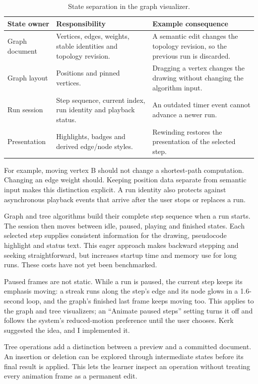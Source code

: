 \documentclass[11pt,a4paper]{article}
\begin{document}
\begin{table}[tbp]\small\centering
\caption{State separation in the graph visualizer.}\label{tab:state}
\begin{tabularx}{\linewidth}{@{}p{31mm}X X@{}}\toprule
State owner & Responsibility & Example consequence\\\midrule
Graph document & Vertices, edges, weights, stable identities and topology revision. & A semantic edit changes the topology revision, so the previous run is discarded.\\
Graph layout & Positions and pinned vertices. & Dragging a vertex changes the drawing without changing the algorithm input.\\
Run session & Step sequence, current index, run identity and playback status. & An outdated timer event cannot advance a newer run.\\
Presentation & Highlights, badges and derived edge/node styles. & Rewinding restores the presentation of the selected step.\\\bottomrule
\end{tabularx}
\end{table}

For example, moving vertex B should not change a shortest-path computation. Changing an edge weight should. Keeping position data separate from semantic input makes this distinction explicit. A run identity also protects against asynchronous playback events that arrive after the user stops or replaces a run.

Graph and tree algorithms build their complete step sequence when a run starts. The session then moves between idle, paused, playing and finished states. Each selected step supplies consistent information for the drawing, pseudocode highlight and status text. This eager approach makes backward stepping and seeking straightforward, but increases startup time and memory use for long runs. These costs have not yet been benchmarked.

Paused frames are not static. While a run is paused, the current step keeps its emphasis moving: a streak runs along the step's edge and its node glows in a 1.6-second loop, and the graph's finished last frame keeps moving too. This applies to the graph and tree visualizers; an ``Animate paused steps'' setting turns it off and follows the system's reduced-motion preference until the user chooses. Kerk suggested the idea, and I implemented it.

Tree operations add a distinction between a preview and a committed document. An insertion or deletion can be explored through intermediate states before its final result is applied. This lets the learner inspect an operation without treating every animation frame as a permanent edit.
\end{document}
